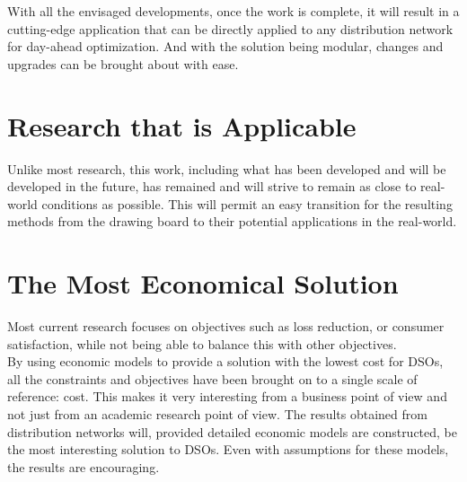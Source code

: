 With all the envisaged developments, once the work is complete, it will result in a cutting-edge application that can be directly applied to any distribution network for day-ahead optimization. And with the solution being modular, changes and upgrades can be brought about with ease.

\section*{Research that is Applicable}
Unlike most research, this work, including what has been developed and will be developed in the future, has remained and will strive to remain as close to real-world conditions as possible. This will permit an easy transition for the resulting methods from the drawing board to their potential applications in the real-world.

\section*{The Most Economical Solution}
Most current research focuses on objectives such as loss reduction, or consumer satisfaction, while not being able to balance this with other objectives.\\

By using economic models to provide a solution with the lowest cost for DSOs, all the constraints and objectives have been brought on to a single scale of reference: cost. This makes it very interesting from a business point of view and not just from an academic research point of view. The results obtained from distribution networks will, provided detailed economic models are constructed, be the most interesting solution to DSOs. Even with assumptions for these models, the results are encouraging.
